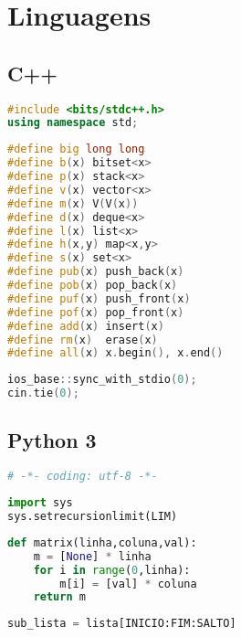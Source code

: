 \chapter{Linguagens}
\section{C++}
\begin{lstlisting}[language=C++, title={Importar a STL inteira}]
#include <bits/stdc++.h>
using namespace std;
\end{lstlisting}

\begin{lstlisting}[language=C++, title={Acelerar digitação}]
#define big long long
#define b(x) bitset<x>
#define p(x) stack<x>
#define v(x) vector<x>
#define m(x) V(V(x))
#define d(x) deque<x>
#define l(x) list<x>
#define h(x,y) map<x,y>
#define s(x) set<x>
#define pub(x) push_back(x)
#define pob(x) pop_back(x)
#define puf(x) push_front(x)
#define pof(x) pop_front(x)
#define add(x) insert(x)
#define rm(x)  erase(x)
#define all(x) x.begin(), x.end()
\end{lstlisting}

\begin{lstlisting}[language=C++, title={Acelerar I/O sem scanf}]
ios_base::sync_with_stdio(0);
cin.tie(0);
\end{lstlisting}
\newpage

\section{Python 3}
\begin{lstlisting}[language=Python, title={Codificação}]
# -*- coding: utf-8 -*-
\end{lstlisting}

\begin{lstlisting}[language=Python, title={Tamanho da Pilha de Recursão}]
import sys
sys.setrecursionlimit(LIM)
\end{lstlisting}

\begin{lstlisting}[language=Python, title={Matriz}]
def matrix(linha,coluna,val):
	m = [None] * linha
	for i in range(0,linha):
		m[i] = [val] * coluna
	return m
\end{lstlisting}

\begin{lstlisting}[language=Python, title={Cortar Lista ou String }] 
sub_lista = lista[INICIO:FIM:SALTO]
\end{lstlisting}

